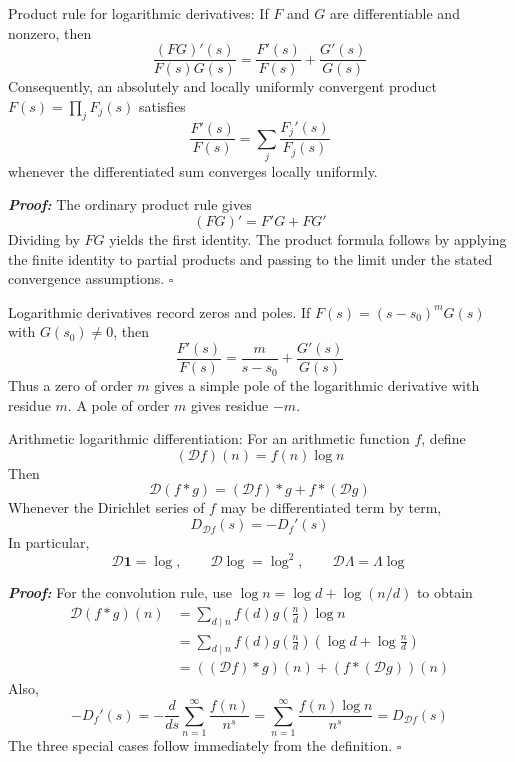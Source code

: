 \documentclass[a4paper,11pt,abstracton]{scrartcl}
\theoremstyle{dotlessP}
\theoremstyle{dotlessS}
\theoremstyle{remark}
\theoremstyle{definition}
\begin{document}
\begin{mainbox}{Product rule for logarithmic derivatives:}
If $F$ and $G$ are differentiable and nonzero, then
\[
    \frac{(FG)'(s)}{F(s)G(s)}
      =\frac{F'(s)}{F(s)}+\frac{G'(s)}{G(s)}
\]
Consequently, an absolutely and locally uniformly convergent product
$F(s)=\prod_jF_j(s)$ satisfies
\[
    \frac{F'(s)}{F(s)}
      =\sum_j\frac{F_j'(s)}{F_j(s)}
\]
whenever the differentiated sum converges locally uniformly.
\end{mainbox}

\begin{claim_box}
\textbf{\textit{Proof:}}
The ordinary product rule gives
\[
    (FG)'=F'G+FG'
\]
Dividing by $FG$ yields the first identity. The product formula follows
by applying the finite identity to partial products and passing to the
limit under the stated convergence assumptions.
\hfill$\square$
\end{claim_box}

\begin{remark_box}
Logarithmic derivatives record zeros and poles. If
$F(s)=(s-s_0)^mG(s)$ with $G(s_0)\neq0$, then
\[
    \frac{F'(s)}{F(s)}
      =\frac{m}{s-s_0}+\frac{G'(s)}{G(s)}
\]
Thus a zero of order $m$ gives a simple pole of the logarithmic
derivative with residue $m$. A pole of order $m$ gives residue $-m$.
\end{remark_box}

\begin{mainbox}{Arithmetic logarithmic differentiation:}
For an arithmetic function $f$, define
\[
    (\mathcal{D}f)(n)=f(n)\log n
\]
Then
\begin{equation}
\label{eq:arithmetic-log-derivative-product}
    \mathcal{D}(f*g)
      =(\mathcal{D}f)*g+f*(\mathcal{D}g)
\end{equation}
Whenever the Dirichlet series of $f$ may be differentiated term by
term,
\[
    D_{\mathcal{D}f}(s)=-D_f'(s)
\]
In particular,
\[
    \mathcal{D}\mathbf{1}=\log,
    \qquad
    \mathcal{D}\log=\log^2,
    \qquad
    \mathcal{D}\Lambda=\Lambda\log
\]
\end{mainbox}

\begin{claim_box}
\textbf{\textit{Proof:}}
For the convolution rule, use
$\log n=\log d+\log(n/d)$ to obtain
\begin{align*}
    \mathcal{D}(f*g)(n)
      &=\sum_{d\mid n}f(d)g\!\left(\frac nd\right)\log n\\
      &=\sum_{d\mid n}f(d)g\!\left(\frac nd\right)
        \left(\log d+\log\frac nd\right)\\
      &=((\mathcal{D}f)*g)(n)+(f*(\mathcal{D}g))(n)
\end{align*}
Also,
\[
    -D_f'(s)
      =-\frac{d}{ds}\sum_{n=1}^{\infty}\frac{f(n)}{n^s}
      =\sum_{n=1}^{\infty}\frac{f(n)\log n}{n^s}
      =D_{\mathcal{D}f}(s)
\]
The three special cases follow immediately from the definition.
\hfill$\square$
\end{claim_box}
\end{document}
